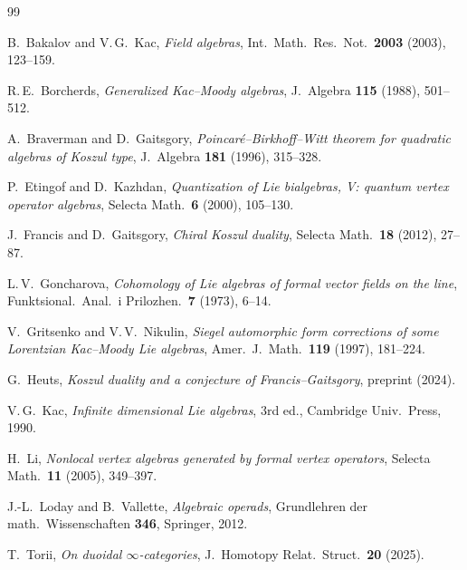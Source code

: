 \documentclass[11pt]{memoir}
\begin{document}
\backmatter

\begin{thebibliography}{99}

B.~Bakalov and V.\,G.~Kac,
\emph{Field algebras},
Int.\ Math.\ Res.\ Not.\ \textbf{2003} (2003), 123--159.

R.\,E.~Borcherds,
\emph{Generalized Kac--Moody algebras},
J.\ Algebra \textbf{115} (1988), 501--512.

A.~Braverman and D.~Gaitsgory,
\emph{Poincar\'e--Birkhoff--Witt theorem for quadratic algebras of
Koszul type},
J.\ Algebra \textbf{181} (1996), 315--328.

P.~Etingof and D.~Kazhdan,
\emph{Quantization of Lie bialgebras, V: quantum vertex operator
algebras},
Selecta Math.\ \textbf{6} (2000), 105--130.

J.~Francis and D.~Gaitsgory,
\emph{Chiral Koszul duality},
Selecta Math.\ \textbf{18} (2012), 27--87.

L.\,V.~Goncharova,
\emph{Cohomology of Lie algebras of formal vector fields on the line},
Funktsional.\ Anal.\ i Prilozhen.\ \textbf{7} (1973), 6--14.

V.~Gritsenko and V.\,V.~Nikulin,
\emph{Siegel automorphic form corrections of some Lorentzian
Kac--Moody Lie algebras},
Amer.\ J.\ Math.\ \textbf{119} (1997), 181--224.

G.~Heuts,
\emph{Koszul duality and a conjecture of Francis--Gaitsgory},
preprint (2024).

V.\,G.~Kac,
\emph{Infinite dimensional Lie algebras},
3rd ed., Cambridge Univ.\ Press, 1990.

H.~Li,
\emph{Nonlocal vertex algebras generated by formal vertex operators},
Selecta Math.\ \textbf{11} (2005), 349--397.

J.-L.~Loday and B.~Vallette,
\emph{Algebraic operads},
Grundlehren der math.\ Wissenschaften \textbf{346}, Springer, 2012.

T.~Torii,
\emph{On duoidal $\infty$-categories},
J.\ Homotopy Relat.\ Struct.\ \textbf{20} (2025).

\end{thebibliography}
\end{document}

